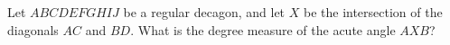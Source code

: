 Let $ABCDEFGHIJ$ be a regular decagon, and let $X$ be the intersection of the diagonals $AC$ and $BD$. What is the degree measure of the acute angle $AXB$?
